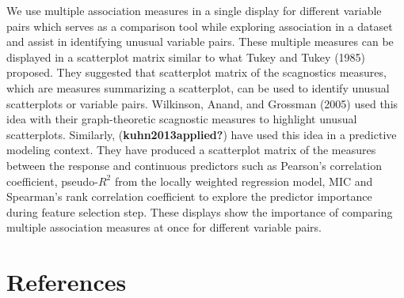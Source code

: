 We use multiple association measures in a single display for different variable pairs which serves as a comparison tool while exploring association in a dataset and assist in identifying unusual variable pairs. These multiple measures can be displayed in a scatterplot matrix similar to what Tukey and Tukey (1985) proposed. They suggested that scatterplot matrix of the scagnostics measures, which are measures summarizing a scatterplot, can be used to identify unusual scatterplots or variable pairs. Wilkinson, Anand, and Grossman (2005) used this idea with their graph-theoretic scagnostic measures to highlight unusual scatterplots. Similarly, (\textbf{kuhn2013applied?}) have used this idea in a predictive modeling context. They have produced a scatterplot matrix of the measures between the response and continuous predictors such as Pearson's correlation coefficient, pseudo-\(R^2\) from the locally weighted regression model, MIC and Spearman's rank correlation coefficient to explore the predictor importance during feature selection step. These displays show the importance of comparing multiple association measures at once for different variable pairs.

\hypertarget{references}{%
\section*{References}\label{references}}

